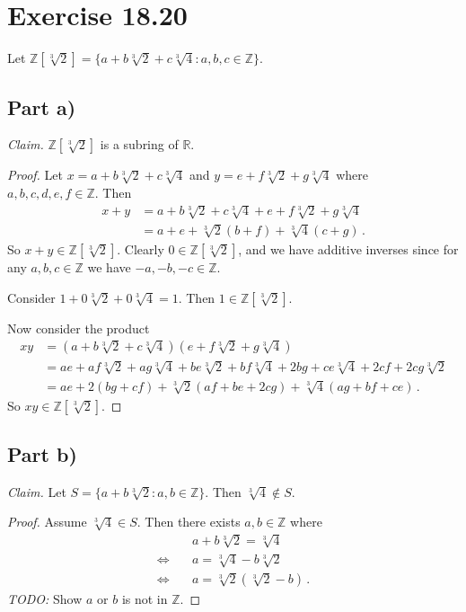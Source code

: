 \documentclass{abrice}
\newcommand{\Z}{\mathbb{Z}}
\newcommand{\R}{\mathbb{R}}
\begin{document}
\section{Exercise 18.20}

Let $\Z[\sqrt[3]{2}] = \{ a + b \sqrt[3]{2} + c \sqrt[3]{4} : a,b,c \in \Z \}$.

\subsection{Part a)}

\emph{Claim.} $\Z[\sqrt[3]{2}]$ is a subring of $\R$.

\begin{proof}
  Let $x = a + b \sqrt[3]{2} + c \sqrt[3]{4}$ and $y = e + f \sqrt[3]{2} + g
  \sqrt[3]{4}$ where $a,b,c,d,e,f \in \Z$. Then
  \begin{align*}
    x + y
    &= a + b \sqrt[3]{2} + c \sqrt[3]{4} + e + f \sqrt[3]{2} + g \sqrt[3]{4} \\
    &= a + e + \sqrt[3]{2}(b + f) + \sqrt[3]{4}(c + g)\, .
  \end{align*}
  So $x + y \in \Z[\sqrt[3]{2}]$. Clearly $0 \in \Z[\sqrt[3]{2}]$, and we have
  additive inverses since for any $a,b,c \in \Z$ we have $-a,-b,-c \in \Z$.

  Consider $1 + 0\sqrt[3]{2} + 0\sqrt[3]{4} = 1$. Then $1 \in \Z[\sqrt[3]{2}]$.

  Now consider the product
  \begin{align*}
    xy
    &= (a + b \sqrt[3]{2} + c \sqrt[3]{4})(e + f \sqrt[3]{2} + g \sqrt[3]{4}) \\
    &= ae + af \sqrt[3]{2} + ag \sqrt[3]{4} + be \sqrt[3]{2} + bf \sqrt[3]{4}
      + 2bg + ce \sqrt[3]{4} + 2cf + 2cg \sqrt[3]{2} \\
    &= ae + 2(bg + cf) + \sqrt[3]{2} (af + be + 2cg) + \sqrt[3]{4} (ag + bf + ce)\, .
  \end{align*}
  So $xy \in \Z[\sqrt[3]{2}]$.
\end{proof}

\subsection{Part b)}

\emph{Claim.} Let $S = \{ a + b \sqrt[3]{2} : a,b \in \Z \}$. Then $\sqrt[3]{4}
\notin S$.

\begin{proof}
  Assume $\sqrt[3]{4} \in S$. Then there exists $a,b \in \Z$ where
  \begin{align*}
    &a + b \sqrt[3]{2} = \sqrt[3]{4} \\
    \Longleftrightarrow \quad
    &a = \sqrt[3]{4} - b \sqrt[3]{2} \\
    \Longleftrightarrow \quad
    &a = \sqrt[3]{2} (\sqrt[3]{2} - b)\, .
  \end{align*}
  \emph{TODO:} Show $a$ or $b$ is not in $\Z$.
\end{proof}
\end{document}

